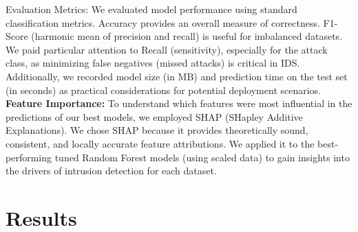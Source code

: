 \documentclass[sigconf,screen,final,nonacm]{acmart}
\newcommand{\circled}[1]{%
  \tikz[baseline=(char.base)]{
    \node[shape=circle, fill=black, text=white, inner sep=1pt, minimum size=1.5em] (char) {#1};
  }%
}
\begin{document}
    \circled{7} {Evaluation Metrics:} We evaluated model performance using standard classification metrics. Accuracy provides an overall measure of correctness. F1-Score (harmonic mean of precision and recall) is useful for imbalanced datasets. We paid particular attention to Recall (sensitivity), especially for the attack class, as minimizing false negatives (missed attacks) is critical in IDS. Additionally, we recorded model size (in MB) and prediction time on the test set (in seconds) as practical considerations for potential deployment scenarios.
    \circled{8} \textbf{Feature Importance:} To understand which features were most influential in the predictions of our best models, we employed SHAP (SHapley Additive Explanations). We chose SHAP because it provides theoretically sound, consistent, and locally accurate feature attributions. We applied it to the best-performing tuned Random Forest models (using scaled data) to gain insights into the drivers of intrusion detection for each dataset.



\section{Results}
\end{document}
